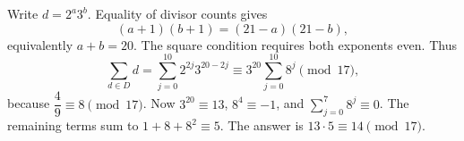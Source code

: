 Write $d=2^a3^b$. Equality of divisor counts gives
\[
(a+1)(b+1)=(21-a)(21-b),
\]
equivalently $a+b=20$. The square condition requires both exponents even. Thus
\[
\sum_{d\in D}d=\sum_{j=0}^{10}2^{2j}3^{20-2j}
\equiv 3^{20}\sum_{j=0}^{10}8^j\pmod{17},
\]
because $\dfrac{4}{9}\equiv8\pmod{17}$. Now $3^{20}\equiv13$, $8^4\equiv-1$, and $\sum_{j=0}^7 8^j\equiv0$. The remaining terms sum to $1+8+8^2\equiv5$. The answer is $\boxed{13\cdot5\equiv14\pmod{17}}$.
